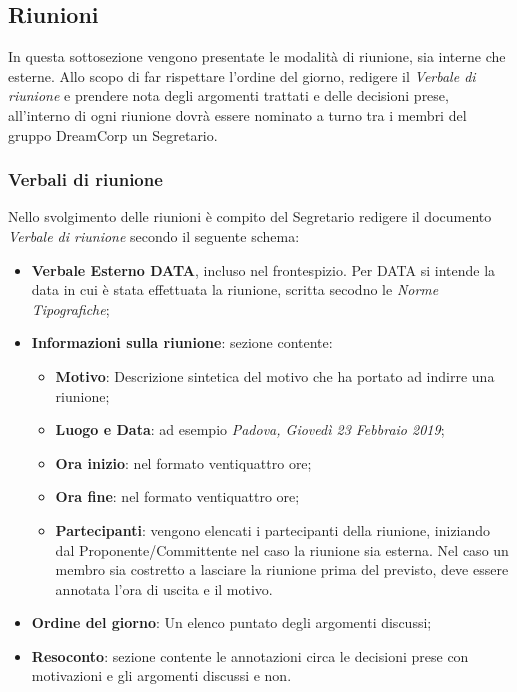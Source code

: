             \subsection{Riunioni}
                In questa sottosezione vengono presentate le modalità di riunione, sia interne che esterne.
                Allo scopo di far rispettare l'ordine del giorno, redigere il \textit{Verbale di riunione} e prendere nota degli argomenti trattati e delle decisioni prese, all'interno di ogni riunione dovrà essere nominato a turno tra i membri del gruppo DreamCorp un Segretario.
                \subsubsection{Verbali di riunione}
                   Nello svolgimento delle riunioni è compito del Segretario redigere il documento \textit{Verbale di riunione} secondo il seguente schema:
                    \begin{itemize}
                        \item \textbf{Verbale Esterno DATA}, incluso nel frontespizio. Per DATA si intende la data in cui è stata effettuata la riunione, scritta secodno le \textit{Norme Tipografiche};
                        \item \textbf{Informazioni sulla riunione}: sezione contente:
                        \begin{itemize}
                            \item \textbf{Motivo}: Descrizione sintetica del motivo che ha portato ad indirre una riunione;
                            \item \textbf{Luogo e Data}: ad esempio \textit{Padova, Giovedì 23 Febbraio 2019}; 
                            \item \textbf{Ora inizio}: nel formato ventiquattro ore;
                            \item \textbf{Ora fine}: nel formato ventiquattro ore;
                            \item \textbf{Partecipanti}: vengono elencati i partecipanti della riunione, iniziando dal Proponente/Committente nel caso la riunione sia esterna. Nel caso un membro sia costretto a lasciare la riunione prima del previsto, deve essere annotata l'ora di uscita e il motivo.
                        \end{itemize}
                        \item \textbf{Ordine del giorno}: Un elenco puntato degli argomenti discussi; 
                        \item \textbf{Resoconto}: sezione contente le annotazioni circa le decisioni prese con motivazioni e gli argomenti discussi e non.
                    \end{itemize}
